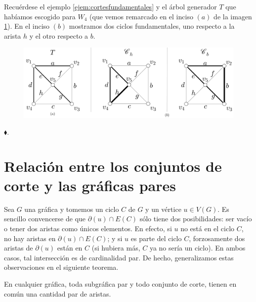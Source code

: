 
 \begin{ejem}
 Recuérdese el ejemplo \ref{ejem:cortesfundamentales} y el árbol generador $T$ que habíamos escogido para $W_{4}$ (que vemos remarcado en el inciso $(a)$ de la imagen \ref{fig:ciclosfundamentales}). En el inciso $(b)$ mostramos dos ciclos fundamentales, uno respecto a la arista $h$ y el otro respecto a $b$.
 
 \begin{figure}[H]
     \centering
     \includegraphics[scale=0.15]{img/imgchapter2/ciclosfundamentales.jpg}
     \caption{}
     \label{fig:ciclosfundamentales}
 \end{figure}
 
 \hfill $\blacklozenge$.
 \end{ejem}
 
 \section{Relación entre los conjuntos de corte y las gráficas pares}
 Sea $G$ una gráfica y tomemos un ciclo $C$ de $G$ y un vértice $u\in V(G)$. Es sencillo convencerse de que $\partial(u) \cap E(C)$ sólo tiene dos posibilidades: ser vacío o tener dos aristas como únicos elementos. En efecto, si $u$ no está en el ciclo $C$, no hay aristas en $\partial(u) \cap E(C)$; y si $u$ es parte del ciclo $C$, forzosamente dos aristas de $\partial(u)$ están en $C$ (si hubiera más, $C$ ya no sería un ciclo).  En ambos casos, tal intersección es de cardinalidad par. De hecho, generalizamos estas observaciones en el siguiente teorema.

\begin{teo} \label{teo:interseccionpar}
En cualquier gráfica, toda subgráfica par y todo conjunto de corte, tienen en común una cantidad par de aristas.
\end{teo}

